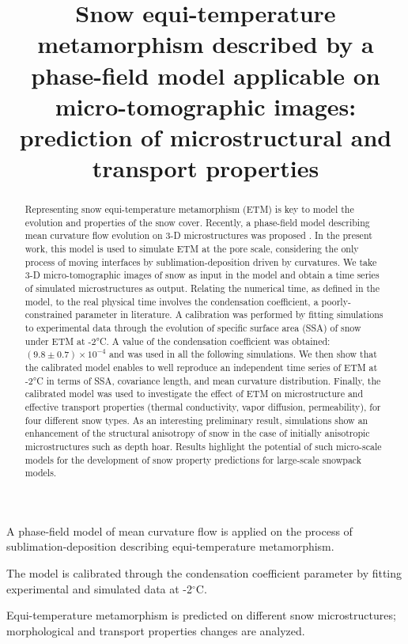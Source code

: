 \documentclass[draft,ms]{agujournal2019}
\begin{document}
\title{Snow equi-temperature metamorphism described by a phase-field model applicable on micro-tomographic images: prediction of microstructural and transport properties}





\begin{keypoints}
\item A phase-field model of mean curvature flow is applied on the process of sublimation-deposition describing equi-temperature metamorphism.
\item The model is calibrated through the condensation coefficient parameter by fitting experimental and simulated data at -2$^\circ$C.
\item Equi-temperature metamorphism is predicted on different snow microstructures; morphological and transport properties changes are analyzed.
\end{keypoints}


\begin{abstract}

Representing snow equi-temperature metamorphism (ETM) is key to model the evolution and properties of the snow cover. Recently, a phase-field model describing mean curvature flow evolution on 3-D microstructures was proposed \cite{bretin_phase-field_2019}. In the present work, this model is used to simulate ETM at the pore scale, considering the only process of moving interfaces by sublimation-deposition driven by curvatures. We take 3-D micro-tomographic images of snow as input in the model and obtain a time series of simulated microstructures as output. Relating the numerical time, as defined in the model, to the real physical time involves the condensation coefficient, a poorly-constrained parameter in literature. A calibration was performed by fitting simulations to experimental data through the evolution of specific surface area (SSA) of snow under ETM at -2°C. A value of the condensation coefficient was obtained: $(9.8\pm0.7)\times 10^{-4}$ and was used in all the following simulations. We then show that the calibrated model enables to well reproduce an independent time series of ETM at -2°C in terms of SSA, covariance length, and mean curvature distribution. Finally, the calibrated model was used to investigate the effect of ETM on microstructure and effective transport properties (thermal conductivity, vapor diffusion, permeability), for four different snow types. As an interesting preliminary result, simulations show an enhancement of the structural anisotropy of snow in the case of initially anisotropic microstructures such as depth hoar. Results highlight the potential of such micro-scale models for the development of snow property predictions for large-scale snowpack models.

\end{abstract}
\end{document}
